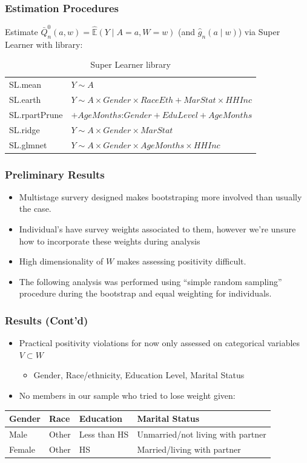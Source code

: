 \documentclass{beamer}
\newcommand{\E}{\mathbb{E}}
\begin{document}
\begin{frame}
\frametitle{Estimation Procedures}
Estimate $\bar{Q}_{n}^{0}(a,w) = \widehat{\E}(Y \mid A=a, W=w)$ (and $\hat{g}_{n}(a\mid w)$) via Super Learner with library:
\begin{table}[ht!]
\begin{tabular}{ll}
SL.mean & $Y \sim A$ \\
SL.earth & $Y \sim A \times Gender \times RaceEth + MarStat \times HHInc$ \\
SL.rpartPrune & $+ AgeMonths$:$Gender + EduLevel + AgeMonths $ \\
SL.ridge & $Y \sim A \times Gender \times MarStat$ \\
SL.glmnet &  $Y \sim A \times Gender \times AgeMonths \times HHInc$ \\
\end{tabular}
\caption{Super Learner library}
\end{table}
\end{frame}

\begin{frame}
\frametitle{Preliminary Results}
\begin{itemize}
\item Multistage survery designed makes bootstraping more involved than usually the case.
\item Individual's have survey weights associated to them, however we're unsure how to incorporate these weights during analysis
\item High dimensionality of $W$ makes assessing positivity difficult.
\item The following analysis was performed using ``simple random sampling'' procedure during the bootstrap and equal weighting for individuals.
\end{itemize}
\end{frame}

\begin{frame}
\frametitle{Results (Cont'd)}
\begin{itemize}
 \item Practical positivity violations for now only assessed on categorical variables $V\subset W$
 \begin{itemize}
  \item Gender, Race/ethnicity, Education Level, Marital Status
 \end{itemize}
 \item No members in our sample who tried to lose weight given:
\end{itemize}
\begin{tabular}{| l | l | l | l |}
\hline
 Gender & Race & Education & Marital Status \\
\hline
Male & Other & Less than HS & Unmarried/not living with partner \\
Female & Other & HS & Married/living with partner \\
\hline
\end{tabular}
\end{frame}
\end{document}
